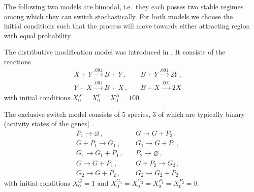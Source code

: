 The following two models are bimodal, i.e.\ they each posses two stable regimes
among which they can switch stochastically.
For both models we choose the initial conditions such that the process
will move towards either attracting region with equal probability.
\begin{model}\label{model:dm}
The distributive modification model was introduced in \citet{cardelli2012cell}.
It consists of the reactions
\begin{align*}
    X + Y \xrightarrow{.001} B + Y\,,\quad
    &B + Y \xrightarrow{.001} 2 Y\,,\\
   Y + X \xrightarrow{.001} B + X\,,\quad
   &B + X \xrightarrow{.001} 2 X
\end{align*}
with initial conditions $X^X_0=X^Y_0=X^B_0=100$.
\end{model}



\begin{model}\label{model:es}
The exclusive switch model consists of 5 species, 3 of which are typically binary (activity states of the genes) \cite{loinger2007stochastic}.
\begin{align*}
    P_1 \xrightarrow{} \varnothing\,,\quad
	&G \xrightarrow{} G + P_2\,,\\
    G + P_1 \xrightarrow{} G_1\,,\quad
	&G_1 \xrightarrow{} G + P_1\,,\\
    G_1 \xrightarrow{} G_1 + P_1\,,\quad
	&P_2 \xrightarrow{} \varnothing\,,\\
    G \xrightarrow{} G + P_1\,,\quad
	&G + P_2 \xrightarrow{} G_2\,,\\
    G_2 \xrightarrow{} G + P_2\,,\quad
	&G_2 \xrightarrow{} G_2 + P_2
\end{align*}
with initial conditions $X^G_0=1$ and $X^{G_1}_0=X^{G_2}_0=X^{P_1}_0=X^{P_2}_0=0$.
\end{model}

